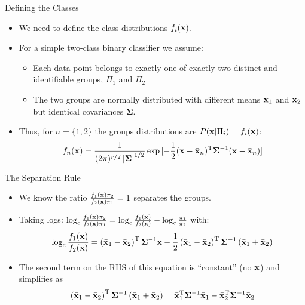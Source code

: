 \documentclass[aspectratio=169]{beamer}
\begin{document}
\begin{frame}{Defining the Classes}
  \begin{itemize}
    \item We need to define the class distributions $f_i(\mathbf{x})$.
    \item For a simple two-class binary classifier we assume:
      \begin{itemize}
      \item Each data point belongs to exactly one of exactly two distinct and identifiable groups, $\Pi_1$ and $\Pi_2$
      \item The two groups are normally distributed with different means $\bar{\mathbf{x}}_1$ and $\bar{\mathbf{x}}_2$ but identical covariances $\mathbf{\Sigma}$.
      \end{itemize}
    \item Thus, for $n=\{1,2\}$ the groups distributions are $P(\mathbf{x}|\Pi_i) = f_i(\mathbf{x})$:
      \begin{equation*}
        f_n(\mathbf{x}) = \frac{1}{(2\pi)^{r/2}\left\lvert \mathbf{\Sigma}\right\rvert^{1/2}}\exp{[-\frac{1}{2}(\mathbf{x}-\bar{\mathbf{x}}_n)^{\mathrm{T}}\mathbf{\Sigma}^{-1}(\mathbf{x}-\bar{\mathbf{x}}_n)]}
      \end{equation*}
  \end{itemize}
\end{frame}

\begin{frame}{The Separation Rule}
  \begin{itemize}
  \item We know the ratio $\frac{f_1(\mathbf{x})\pi_2}{f_2(\mathbf{x})\pi_1}=1$ separates the groups.
  \item Taking logs: $\log_e\frac{f_1(\mathbf{x})\pi_2}{f_2(\mathbf{x})\pi_1} = \log_e\frac{f_1(\mathbf{x})}{f_2(\mathbf{x})}-\log_e\frac{\pi_1}{\pi_2}$ with:
    \begin{equation*}
      \log_e\frac{f_1(\mathbf{x})}{f_2(\mathbf{x})} = \left(\bar{\mathbf{x}}_1-\bar{\mathbf{x}}_2\right)^{\mathrm{T}}\mathbf{\Sigma}^{-1}\mathbf{x} -\frac{1}{2}\left(\bar{\mathbf{x}}_1-\bar{\mathbf{x}}_2\right)^{\mathrm{T}}\mathbf{\Sigma}^{-1}\left(\bar{\mathbf{x}}_1+\bar{\mathbf{x}}_2\right)\label{eq:logp1p2}
    \end{equation*}
  \item The second term on the RHS of this equation is ``constant'' (no $\mathbf{x}$) and simplifies as
    \begin{equation*}
      \left(\bar{\mathbf{x}}_1-\bar{\mathbf{x}}_2\right)^{\mathrm{T}}\mathbf{\Sigma}^{-1}\left(\bar{\mathbf{x}}_1+\bar{\mathbf{x}}_2\right)  =\bar{\mathbf{x}}_1^{\mathrm{T}}\mathbf{\Sigma}^{-1}\bar{\mathbf{x}}_1 - \bar{\mathbf{x}}_2^{\mathrm{T}}\mathbf{\Sigma}^{-1}\bar{\mathbf{x}}_2
    \end{equation*}
  \end{itemize}
\end{frame}
\end{document}
